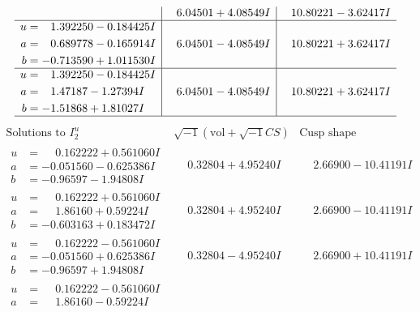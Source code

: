 \documentclass[1p]{elsarticle_modified}
\theoremstyle{definition}
\newcommand{\I}{\sqrt{-1}}
\begin{document}
$$\begin{array}{c|c|c}
 & \phantom{-}6.04501 + 4.08549 I & \phantom{-}10.80221 - 3.62417 I \\ \hline\begin{aligned}
u &= \phantom{-}1.392250 - 0.184425 I \\
a &= \phantom{-}0.689778 - 0.165914 I \\
b &= -0.713590 + 1.011530 I\end{aligned}
 & \phantom{-}6.04501 - 4.08549 I & \phantom{-}10.80221 + 3.62417 I \\ \hline\begin{aligned}
u &= \phantom{-}1.392250 - 0.184425 I \\
a &= \phantom{-}1.47187 - 1.27394 I \\
b &= -1.51868 + 1.81027 I\end{aligned}
 & \phantom{-}6.04501 - 4.08549 I & \phantom{-}10.80221 + 3.62417 I\\
 \hline 
 \end{array}$$\newpage$$\begin{array}{c|c|c}  
\text{Solutions to }I^u_{2}& \I (\text{vol} + \sqrt{-1}CS) & \text{Cusp shape}\\
 \hline 
\begin{aligned}
u &= \phantom{-}0.162222 + 0.561060 I \\
a &= -0.051560 - 0.625386 I \\
b &= -0.96597 - 1.94808 I\end{aligned}
 & \phantom{-}0.32804 + 4.95240 I & \phantom{-}2.66900 - 10.41191 I \\ \hline\begin{aligned}
u &= \phantom{-}0.162222 + 0.561060 I \\
a &= \phantom{-}1.86160 + 0.59224 I \\
b &= -0.603163 + 0.183472 I\end{aligned}
 & \phantom{-}0.32804 + 4.95240 I & \phantom{-}2.66900 - 10.41191 I \\ \hline\begin{aligned}
u &= \phantom{-}0.162222 - 0.561060 I \\
a &= -0.051560 + 0.625386 I \\
b &= -0.96597 + 1.94808 I\end{aligned}
 & \phantom{-}0.32804 - 4.95240 I & \phantom{-}2.66900 + 10.41191 I \\ \hline\begin{aligned}
u &= \phantom{-}0.162222 - 0.561060 I \\
a &= \phantom{-}1.86160 - 0.59224 I \\

\end{aligned}
\end{array}$$
\end{document}
